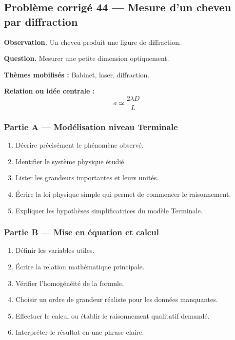 \documentclass[11pt,a4paper]{article}
\begin{document}
\subsection{Problème corrigé 44 — Mesure d'un cheveu par diffraction}

\begin{exercicebox}
\textbf{Observation.} Un cheveu produit une figure de diffraction.

\medskip
\textbf{Question.} Mesurer une petite dimension optiquement.

\medskip
\textbf{Thèmes mobilisés :} Babinet, laser, diffraction.

\medskip
\textbf{Relation ou idée centrale :}
\[
a\simeq\frac{2\lambda D}{L}
\]
\end{exercicebox}

\subsubsection*{Partie A — Modélisation niveau Terminale}

\begin{enumerate}
  \item Décrire précisément le phénomène observé.
  \item Identifier le système physique étudié.
  \item Lister les grandeurs importantes et leurs unités.
  \item Écrire la loi physique simple qui permet de commencer le raisonnement.
  \item Expliquer les hypothèses simplificatrices du modèle Terminale.
\end{enumerate}

\subsubsection*{Partie B — Mise en équation et calcul}

\begin{enumerate}
  \item Définir les variables utiles.
  \item Écrire la relation mathématique principale.
  \item Vérifier l'homogénéité de la formule.
  \item Choisir un ordre de grandeur réaliste pour les données manquantes.
  \item Effectuer le calcul ou établir le raisonnement qualitatif demandé.
  \item Interpréter le résultat en une phrase claire.
\end{enumerate}
\end{document}
